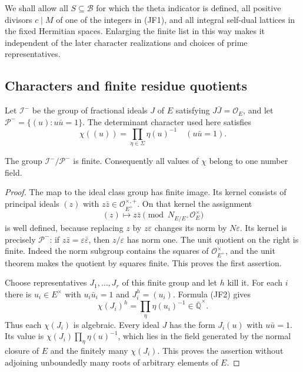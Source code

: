 We shall allow all $S\subseteq\mathcal B$ for which the theta
indicator is defined, all positive divisors $c\mid M$ of
one of the integers in (JF1), and all integral self-dual
lattices in the fixed Hermitian spaces. Enlarging the finite
list in this way makes it independent of the later character
realizations and choices of prime representatives.

\subsection{Characters and finite residue quotients}

Let $\mathcal I^-$ be the group of fractional ideals $J$ of
$E$ satisfying $J\bar J=\mathcal O_E$, and let
$\mathcal P^-=\{(u):u\bar u=1\}$. The determinant character
used here satisfies
\[
                  \chi((u))=\prod_{\eta\in\Sigma}\eta(u)^{-1}
                         \quad(u\bar u=1).               \tag{JF2}
\]

\begin{lemma}\label{jcf-character-values}
The group $\mathcal I^-/\mathcal P^-$ is finite. Consequently
all values of $\chi$ belong to one number field.
\end{lemma}
\begin{proof}
The map to the ideal class group has finite image. Its kernel
consists of principal ideals $(z)$ with $z\bar z\in
\mathcal O_{E^+}^{\times,+}$. On that kernel the assignment
\[
 (z)\longmapsto z\bar z\pmod {N_{E/E^+}\mathcal O_E^\times}
\]
is well defined, because replacing $z$ by $z\varepsilon$ changes
its norm by $N\varepsilon$. Its kernel is precisely
$\mathcal P^-$: if $z\bar z=\varepsilon\bar\varepsilon$, then
$z/\varepsilon$ has norm one. The unit quotient on the right
is finite. Indeed the norm subgroup contains the squares of
$\mathcal O_{E^+}^\times$, and the unit theorem makes the
quotient by squares finite. This proves the first assertion.

Choose representatives $J_1,\ldots,J_r$ of this finite group
and let $h$ kill it. For each $i$ there is $u_i\in E^\times$
with $u_i\bar u_i=1$ and $J_i^h=(u_i)$. Formula (JF2) gives
\[
                  \chi(J_i)^h=
                         \prod_\eta\eta(u_i)^{-1}
                          \in\overline{\mathbb Q}^{\times}.
\]
Thus each $\chi(J_i)$ is algebraic. Every ideal $J$ has the
form $J_i(u)$ with $u\bar u=1$. Its value is
$\chi(J_i)\prod_\eta\eta(u)^{-1}$, which lies in the field
generated by the normal closure of $E$ and the finitely many
$\chi(J_i)$. This proves the assertion without adjoining
unboundedly many roots of arbitrary elements of $E$.
\end{proof}

